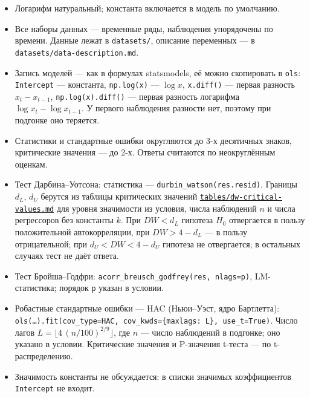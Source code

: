\documentclass[
  russian,
]{article}
\providecommand{\tightlist}{%
  \setlength{\itemsep}{0pt}\setlength{\parskip}{0pt}}
\begin{document}
\begin{tcolorbox}
\begin{itemize}
\tightlist
\item
  Логарифм натуральный; константа включается в модель по умолчанию.
\item
  Все наборы данных --- временные ряды, наблюдения упорядочены по
  времени. Данные лежат в \texttt{datasets/}, описание переменных --- в
  \texttt{datasets/data-description.md}.
\item
  Запись моделей --- как в формулах statsmodels, её можно скопировать в
  \texttt{ols}: \texttt{Intercept} --- константа, \texttt{np.log(x)} ---
  \(\log x\), \texttt{x.diff()} --- первая разность \(x_t - x_{t-1}\),
  \texttt{np.log(x).diff()} --- первая разность логарифма
  \(\log x_t - \log x_{t-1}\). У первого наблюдения разности нет,
  поэтому при подгонке оно теряется.
\item
  Статистики и стандартные ошибки округляются до 3-х десятичных знаков,
  критические значения --- до 2-х. Ответы считаются по неокруглённым
  оценкам.
\item
  Тест Дарбина--Уотсона: статистика ---
  \texttt{durbin\_watson(res.resid)}. Границы \(d_L\), \(d_U\) берутся
  из таблицы критических значений
  \href{../tables/dw-critical-values.md}{\texttt{tables/dw-critical-values.md}}
  для уровня значимости из условия, числа наблюдений \(n\) и числа
  регрессоров без константы \(k\). При \(DW < d_L\) гипотеза \(H_0\)
  отвергается в пользу положительной автокорреляции, при
  \(DW > 4 - d_L\) --- в пользу отрицательной; при
  \(d_U < DW < 4 - d_U\) гипотеза не отвергается; в остальных случаях
  тест не даёт ответа.
\item
  Тест Бройша--Годфри: \texttt{acorr\_breusch\_godfrey(res,\ nlags=p)},
  LM-статистика; порядок \texttt{p} указан в условии.
\item
  Робастные стандартные ошибки --- HAC (Ньюи--Уэст, ядро Бартлетта):
  \texttt{ols(…).fit(cov\_type=\textquotesingle{}HAC\textquotesingle{},\ cov\_kwds=\{\textquotesingle{}maxlags\textquotesingle{}:\ L\},\ use\_t=True)}.
  Число лагов \(L=\lfloor 4\,(n/100)^{2/9}\rfloor\), где \(n\) --- число
  наблюдений в подгонке; оно указано в условии. Критические значения и
  P-значения t-теста --- по t-распределению.
\item
  Значимость константы не обсуждается: в списки значимых коэффициентов
  \texttt{Intercept} не входит.
\end{itemize}

\end{tcolorbox}
\end{document}
